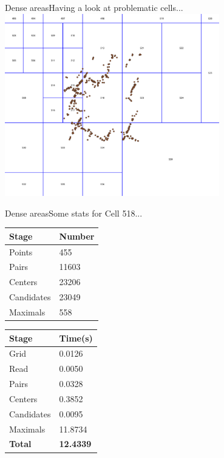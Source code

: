 \documentclass{beamer}
\begin{document}
\begin{frame}{Dense areas}{Having a look at problematic cells...}
    \centering
    \includegraphics[width=0.7\textwidth]{figures/cell518}
\end{frame}

\begin{frame}{Dense areas}{Some stats for Cell 518...}
        \begin{table}[ht]
                \centering
                \begin{tabular}{ll}
                        \hline
                        \textbf{Stage} & \textbf{Number} \\
                        \hline
                        Points      & 455 \\
                        Pairs       & 11603 \\
                        Centers     & 23206 \\
                        Candidates  & 23049 \\
                        Maximals    & 558 \\
                          \hline
                \end{tabular}
        \end{table}
        \begin{table}[ht]
                \centering
                \begin{tabular}{ll}
                        \hline
                        \textbf{Stage} & \textbf{Time(s)} \\
                        \hline
                        Grid       & 0.0126 \\
                        Read       & 0.0050 \\
                        Pairs      & 0.0328 \\
                        Centers    & 0.3852 \\
                        Candidates & 0.0095 \\
                        Maximals   & 11.8734 \\
                        \textbf{Total}      & \textbf{12.4339} \\
                        \hline
                \end{tabular}
        \end{table}
\end{frame}
\end{document}
